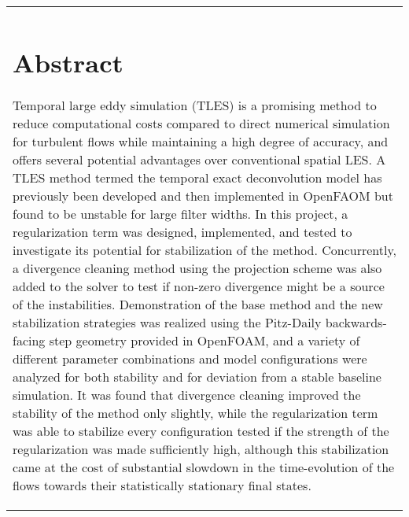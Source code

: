 \begin{tabular}{p{}}
\chapter*{Abstract}

Temporal large eddy simulation (TLES) is a promising method to reduce computational costs compared to direct numerical simulation for turbulent flows while maintaining a high degree of accuracy, and offers several potential advantages over conventional spatial LES. A TLES method termed the temporal exact deconvolution model has previously been developed and then implemented in OpenFAOM but found to be unstable for large filter widths. In this project, a regularization term was designed, implemented, and tested to investigate its potential for stabilization of the method. Concurrently, a divergence cleaning method using the projection scheme was also added to the solver to test if non-zero divergence might be a source of the instabilities. Demonstration of the base method and the new stabilization strategies was realized using the Pitz-Daily backwards-facing step geometry provided in OpenFOAM, and a variety of different parameter combinations and model configurations were analyzed for both stability and for deviation from a stable baseline simulation. It was found that divergence cleaning improved the stability of the method only slightly, while the regularization term was able to stabilize every configuration tested if the strength of the regularization was made sufficiently high, although this stabilization came at the cost of substantial slowdown in the time-evolution of the flows towards their statistically stationary final states.

\end{tabular}
